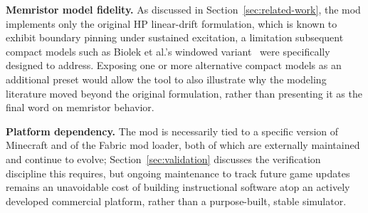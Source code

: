 \textbf{Memristor model fidelity.} As discussed in Section~\ref{sec:related-work}, the mod
implements only the original HP linear-drift formulation, which is known to exhibit boundary
pinning under sustained excitation, a limitation subsequent compact models such as Biolek et
al.'s windowed variant~\cite{biolek2009spice} were specifically designed to address. Exposing
one or more alternative compact models as an additional preset would allow the tool to also
illustrate why the modeling literature moved beyond the original formulation, rather than
presenting it as the final word on memristor behavior.

\textbf{Platform dependency.} The mod is necessarily tied to a specific version of
Minecraft and of the Fabric mod loader, both of which are externally maintained and continue
to evolve; Section~\ref{sec:validation} discusses the verification discipline this
requires, but ongoing maintenance to track future game updates remains an unavoidable cost
of building instructional software atop an actively developed commercial platform, rather
than a purpose-built, stable simulator.
